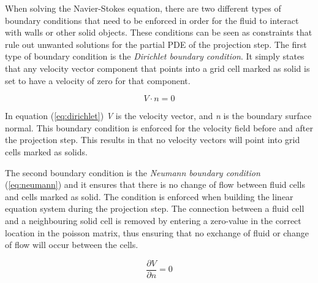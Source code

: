 When solving the Navier-Stokes equation, there are two different types of boundary conditions that need to be enforced in order for the fluid to interact with walls or other solid objects. These conditions can be seen as constraints that rule out unwanted solutions for the partial PDE of the projection step. The first type of boundary condition is the \emph{Dirichlet boundary condition}. It simply states that any velocity vector component that points into a grid cell marked as solid is set to have a velocity of zero for that component.

\begin{equation}
\label{eq:dirichlet}
V \cdot n = 0
\end{equation}

In equation (\ref{eq:dirichlet}) \emph{V} is the velocity vector, and \emph{n} is the boundary surface normal. This boundary condition is enforced for the velocity field before and after the projection step. This results in that no velocity vectors will point into grid cells marked as solids.

The second boundary condition is the \emph{Neumann boundary condition} (\ref{eq:neumann}) and it ensures that there is no change of flow between fluid cells and cells marked as solid. The condition is enforced when building the linear equation system during the projection step. The connection between a fluid cell and a neighbouring solid cell is removed by entering a zero-value in the correct location in the poisson matrix, thus ensuring that no exchange of fluid or change of flow will occur between the cells.

\begin{equation}
\label{eq:neumann}
\frac{\partial V}{\partial n} = 0
\end{equation}